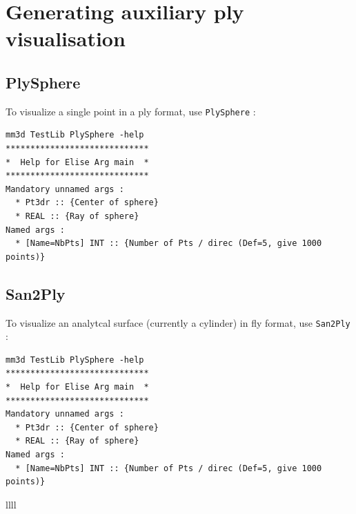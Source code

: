 {

\section{Generating auxiliary ply visualisation}


\subsection{PlySphere}

To visualize a single point in a ply format, use {\tt PlySphere} :

\begin{verbatim}
mm3d TestLib PlySphere -help
*****************************
*  Help for Elise Arg main  *
*****************************
Mandatory unnamed args : 
  * Pt3dr :: {Center of sphere}
  * REAL :: {Ray of sphere}
Named args : 
  * [Name=NbPts] INT :: {Number of Pts / direc (Def=5, give 1000 points)}
\end{verbatim}


\subsection{San2Ply}

To visualize an analytcal surface (currently a cylinder) in fly format, use {\tt San2Ply} :

\begin{verbatim}
mm3d TestLib PlySphere -help
*****************************
*  Help for Elise Arg main  *
*****************************
Mandatory unnamed args : 
  * Pt3dr :: {Center of sphere}
  * REAL :: {Ray of sphere}
Named args : 
  * [Name=NbPts] INT :: {Number of Pts / direc (Def=5, give 1000 points)}
\end{verbatim}


llll
}







